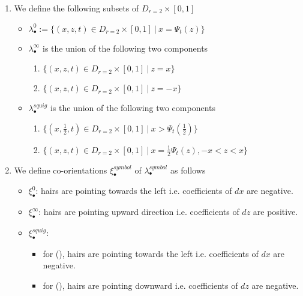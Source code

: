 \begin{definition}
\begin{enumerate}
\item We define the following subsets of $D_{r=2}\times [0,1]$
\begin{itemize}
\item $\lambda_\bullet^0 := \{(x,z,t) \in D_{r=2} \times [0,1] ~|~ x = \Psi_t(z)\}$

\item $\lambda_\bullet^\infty$ is the union of the following two components
\begin{enumerate}[label=(\roman*)]
\item $\{(x,z,t) \in D_{r=2}\times [0,1] ~|~ z = x \}$

\item $\{(x,z,t) \in D_{r=2}\times [0,1] ~|~ z = -x \}$
\end{enumerate}

\item $\lambda_\bullet^{squig}$ is the union of the following two components
\begin{enumerate}[label=(\roman*)]

\item $\{(x,\frac{1}{2},t) \in D_{r=2}\times [0,1] ~|~ x > \Psi_t(\frac{1}{2}) \}$

\item $\{(x,z,t) \in D_{r=2}\times [0,1] ~|~ x = \frac{1}{2}\Psi_t(z), -x < z < x  \}$
\end{enumerate}
\end{itemize}

\item We define co-orientations $\xi_\bullet^{symbol}$ of $\lambda_\bullet^{symbol}$ as follows
\begin{itemize}
\item $\xi_\bullet^0$: hairs are pointing towards the left i.e. coefficients of $dx$ are negative.

\item $\xi_\bullet^\infty$: hairs are pointing upward direction i.e. coefficients of $dz$ are positive.

\item $\xi_\bullet^{squig}$: 
\begin{itemize}
\item for (), hairs are pointing towards the left i.e. coefficients of $dx$ are negative.
\item for (), hairs are pointing downward i.e. coefficients of $dz$ are negative.
\end{itemize}
\end{itemize}
\end{enumerate}
\end{definition}

